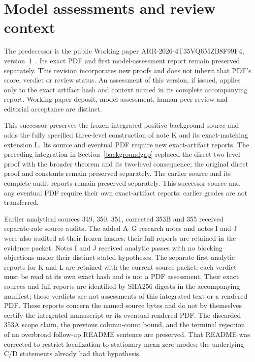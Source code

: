 \documentclass[11pt]{article}
\begin{document}
\section{Model assessments and review context}
The predecessor is the public Working paper ARR-2026-4T35VQ6MZB8F99F4, version~1~\cite{predecessor}. Its exact PDF and first model-assessment report remain preserved separately. This revision incorporates new proofs and does not inherit that PDF's score, verdict or review status. An assessment of this version, if issued, applies only to the exact artifact hash and context named in its complete accompanying report. Working-paper deposit, model assessment, human peer review and editorial acceptance are distinct.

This successor preserves the frozen integrated positive-background source and adds the fully specified three-level construction of note K and its exact-matching extension L. Its source and eventual PDF require new exact-artifact reports. The preceding integration in Section~\ref{backgroundgap} replaced the direct two-level proof with the broader theorem and its two-level consequence; the original direct proof and constants remain preserved separately. The earlier source and its complete audit reports remain preserved separately. This successor source and any eventual PDF require their own exact-artifact reports; earlier grades are not transferred.

Earlier analytical sources 349, 350, 351, corrected 353B and 355 received separate-role source audits. The added A--G research notes and notes I and J were also audited at their frozen hashes; their full reports are retained in the evidence packet. Notes I and J received analytic passes with no blocking objections under their distinct stated hypotheses. The separate first analytic reports for K and L are retained with the current source packet; each verdict must be read at its own exact hash and is not a PDF assessment. Their exact sources and full reports are identified by SHA256 digests in the accompanying manifest; those verdicts are not assessments of this integrated text or a rendered PDF. These reports concern the named source bytes and do not by themselves certify the integrated manuscript or its eventual rendered PDF. The discarded 353A scope claim, the previous column-count bound, and the terminal rejection of an overbroad follow-up README sentence are preserved. That README was corrected to restrict localization to stationary-mean-zero modes; the underlying C/D statements already had that hypothesis.
\end{document}

